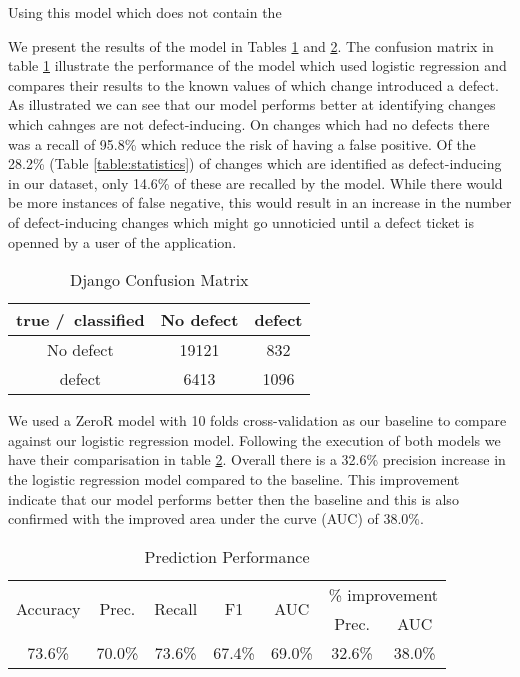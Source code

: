 \documentclass[10pt, conference]{IEEEtran}
\begin{document}
Using this model which does not contain the 

We present the results of the model in Tables \ref{table:confusion} and \ref{table:prediction}. The confusion matrix in table \ref{table:confusion} illustrate the performance of the model which used logistic regression and compares their results to the known values of which change introduced a defect. As illustrated we can see that our model performs better at identifying changes which cahnges are not defect-inducing. On changes which had no defects there was a recall of 95.8\% which reduce the risk of having a false positive. Of the 28.2\% (Table \ref{table:statistics}) of changes which are identified as defect-inducing in our dataset, only 14.6\% of these are recalled by the model. While there would be more instances of false negative, this would result in an increase in the number of defect-inducing changes which might go unnoticied until a defect ticket is openned by a user of the application.  
\begin{table}[b]
	\centering
	\caption{Django Confusion Matrix}
	\begin{tabular}{|c|c|c|}
		\hline 
		true /\ classified  & No defect  & defect \tabularnewline
		\hline 
		No defect  & 19121  & 832 \tabularnewline
		\hline 
		defect  & 6413  & 1096 \tabularnewline
		\hline 
	\end{tabular}
	\label{table:confusion}
\end{table}

We used a ZeroR model with 10 folds cross-validation as our baseline to compare against our logistic regression model. Following the execution of both models we have their comparisation in table \ref{table:prediction}. Overall there is a 32.6\% precision increase in the logistic regression model compared to the baseline. This improvement indicate that our model performs better then the baseline and this is also confirmed with the improved area under the curve (AUC) of 38.0\%.   

\begin{table}
	\centering
	\caption{Prediction Performance}
	\begin{tabular}{|c|c|c|c|c||c|c|}
		\hline \multirow{2}{*}{Accuracy} & \multirow{2}{*}{Prec.} & \multirow{2}{*}{Recall} & \multirow{2}{*}{F1} & \multirow{2}{*}{AUC} & \multicolumn{2}{|c|}{\% improvement} \\ \cline{6-7} 
		 &  &  &  &  & Prec. & AUC \\  
		\hline 73.6\% & 70.0\% & 73.6\% & 67.4\% & 69.0\% & 32.6\% & 38.0\% \\ 
		\hline 
	\end{tabular}
	
	\label{table:prediction} 
\end{table}
\end{document}
